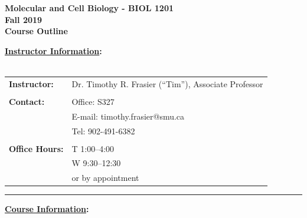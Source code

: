 \documentclass[hidelinks]{article}
\begin{document}
\vspace*{0.01cm}

\begin{center}
	\Large{\textbf{Molecular and Cell Biology  - BIOL 1201\\
	Fall 2019\\
	Course Outline}}
\end{center}


\textbf{\underline{Instructor Information}:}\\
\\
	\begin{tabular}{@{} p{2.3cm} l }
		\textbf{Instructor:}	& Dr. Timothy R. Frasier (``Tim''), Associate Professor\\
		\\
		\textbf{Contact:} 	& Office: S327\\
					& E-mail: timothy.frasier@smu.ca\\
					& Tel: 902-491-6382\\
		\\
		\textbf{Office Hours:} & T 1:00--4:00\\
			& W 9:30--12:30 \\
			& or by appointment				
	\end{tabular}

	\begin{center}
		\rule{4cm}{0.5pt}
	\end{center}


\textbf{\underline{Course Information}:}
\end{document}
